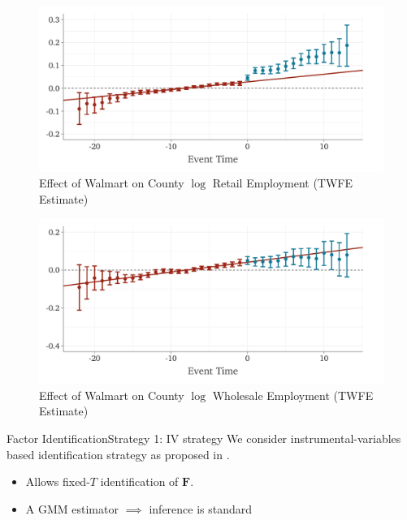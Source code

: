 \documentclass[aspectratio=43,t,11pt]{beamer}
\begin{document}
\begin{frame}
  \begin{figure}
    \caption{Effect of Walmart on County $\log$ Retail Employment (TWFE Estimate)}
    \begin{adjustbox}{width=\textwidth}
      \includegraphics{../figures/plot_did2s_retail.pdf}
    \end{adjustbox}
  \end{figure}
\end{frame}

\begin{frame}
  \begin{figure}
    \caption{Effect of Walmart on County $\log$ Wholesale Employment (TWFE Estimate)}
    \begin{adjustbox}{width=\textwidth}
      \includegraphics{../figures/plot_did2s_wholesale.pdf}
    \end{adjustbox}
  \end{figure}
\end{frame}

\begin{frame}{Factor Identification}{Strategy 1: IV strategy}\label{slide:qld_strategy}
  We consider instrumental-variables based identification strategy as proposed in \citet{Ahn_Lee_Schmidt_2013}.
  \begin{itemize}
    \item Allows fixed-$T$ identification of $\bm{F}$.
    \item A GMM estimator $\implies$ inference is standard
  \end{itemize}

\end{frame}
\end{document}
